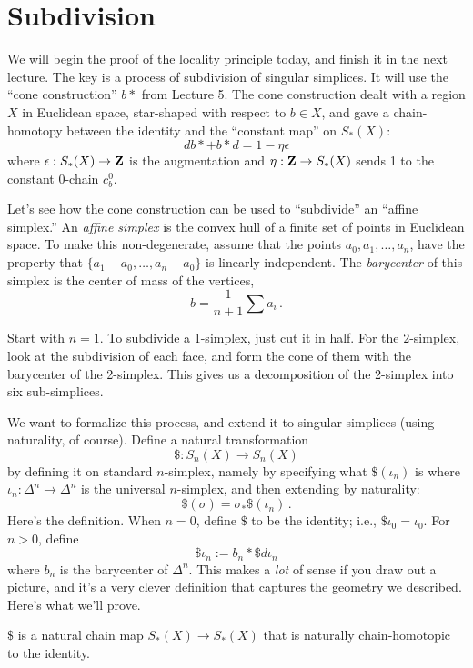 \section{Subdivision}

We will begin the proof of the locality principle today, 
and finish it in the next lecture.
The key is a process of subdivision of singular simplices. It will use the 
``cone construction'' $b*$ from Lecture 5. The cone construction 
dealt with a region $X$ 
in Euclidean space, star-shaped with respect to $b\in X$, and gave a 
chain-homotopy between the identity and the ``constant map'' on $S_*(X)$:
\[
db*+b*d=1-\eta\epsilon
\]
where $\epsilon:S_*(X)\to\mathbf Z$ is the augmentation and $\eta:\mathbf Z\to S_*(X)$
sends 1 to the constant 0-chain $c_b^0$. 

Let's see how the cone construction can be used to ``subdivide'' an ``affine 
simplex.'' An {\em affine simplex} is the convex hull of a finite set of points in Euclidean space. To make this non-degenerate, assume that the points $a_0,a_1,\ldots,a_n$, have the property that $\{a_1-a_0,\ldots,a_n-a_0\}$ is linearly independent. 
The {\em barycenter} of this simplex is the center of mass of the vertices, 
\[
b=\frac{1}{n+1}\sum{a_i}\,.
\]

Start with $n=1$. To subdivide a 1-simplex, just cut it in half. 
For the $2$-simplex, look at the subdivision of each face, and form the cone
of them with the barycenter of the 2-simplex. This gives us a decomposition of
the 2-simplex into six sub-simplices. 

We want to formalize this process, and extend it to singular simplices (using
naturality, of course). Define a natural transformation 
\[
\$:S_n(X)\to S_n(X)
\]
 by defining it on standard $n$-simplex, namely by specifying what $\$(\iota_n)$ is where $\iota_n:\Delta^n\rightarrow\Delta^n$ is the universal $n$-simplex, and then extending by naturality:
\[
\$(\sigma)=\sigma_\ast\$(\iota_n)\,.
\]
Here's the definition. When $n=0$, define $\$$ to be the identity; i.e., $\$\iota_0=\iota_0$. For $n>0$, define 
\[
\$\iota_n:=b_n\ast\$ d\iota_n
\]
where $b_n$ is the barycenter of $\Delta^n$. This makes a \emph{lot} of sense if you draw out a picture, and it's a very clever definition that captures the geometry we described. Here's what we'll prove.
\begin{prop}
$\$$ is a natural chain map $S_\ast(X)\to S_\ast(X)$ that is naturally chain-homotopic to the identity. 
\end{prop}

